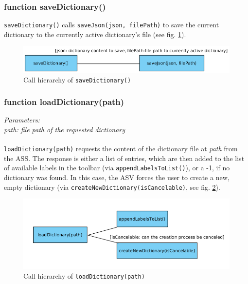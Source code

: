 \subsubsection{function saveDictionary()}
\texttt{saveDictionary()} calls \texttt{saveJson(json, filePath)} to save the current dictionary to the currently active dictionary's file (see fig. \ref{figB_saveDict}).

\begin{figure}[H]
	\begin{center}
		\includegraphics[scale=0.5]{img/ch_saveDict.png}
		\caption{Call hierarchy of \texttt{saveDictionary()}}
		\label{figB_saveDict}
	\end{center}
\end{figure}


\subsubsection{function loadDictionary(path)}
\emph{Parameters:\\
	path: file path of the requested dictionary\\ \\
}
\texttt{loadDictionary(path)} requests the content of the dictionary file at \emph{path} from the ASS. The response is either a list of entries, which are then added to the list of available labels in the toolbar (via \texttt{appendLabelsToList()}), or a -1, if no dictionary was found. In this case, the ASV forces the user to create a new, empty dictionary (via \texttt{createNewDictionary(isCancelable)}, see fig. \ref{figB_loadDict}).

\begin{figure}[H]
	\begin{center}
		\includegraphics[scale=0.5]{img/ch_loadDict.png}
		\caption{Call hierarchy of \texttt{loadDictionary(path)}}
		\label{figB_loadDict}
	\end{center}
\end{figure}


